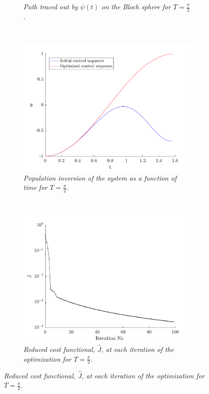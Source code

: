\begin{figure}[h!]
\begin{subfigure}[t]{0.49\textwidth}
        \caption{\textit{Path traced out by $\psi (t)$ on the Bloch sphere for $T = \frac{\pi}{2}$.}}
        \label{fig:path}
    \end{subfigure}         
	~
    \begin{subfigure}[t]{0.49\textwidth}
        \includegraphics[width=\textwidth]{Figures/pop.pdf}
        \caption{\textit{Population inversion of the system as a function of time for $T = \frac{\pi}{2}$.}}
        \label{fig:population}
    \end{subfigure}
    ~
    \begin{subfigure}[t]{0.49\textwidth}
        \includegraphics[width=\textwidth]{Figures/cost.pdf}
        \caption{\textit{Reduced cost functional, $\hat{J}$, at each iteration of the optimization for $T = \frac{\pi}{2}$.}}
        \label{fig:cost}
    \end{subfigure}    
\end{figure}
